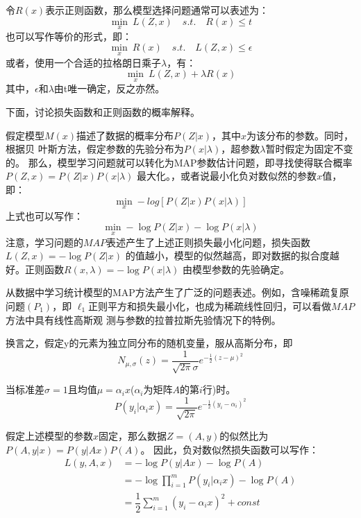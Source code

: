 令$ R(x) $表示正则函数，那么模型选择问题通常可以表述为：
\begin{equation}\label{key}
\min_{x}\:  L(Z,x)\quad s.t.\quad R(x)\leq t
\end{equation}
也可以写作等价的形式，即：
\begin{equation}\label{key}
\min_{x}\: R(x) \quad  s.t.\quad L(Z,x)\leq \epsilon
\end{equation}
或者，使用一个合适的拉格朗日乘子$\lambda $，有：
\begin{equation}\label{key}
\min_{x}\:  L(Z,x)+\lambda R(x)
\end{equation}
其中，$ \epsilon $和$ \lambda $由t唯一确定，反之亦然。

{\heiti 下面，讨论损失函数和正则函数的概率解释。}

假定模型$ M(x) $描述了数据的概率分布$ P(Z|x) $，其中$ x $为该分布的参数。同时，根据贝
叶斯方法，假定参数的先验分布为$ P(x|\lambda) $，超参数$ \lambda $暂时假定为固定不变的。
那么，模型学习问题就可以转化为MAP参数估计问题，即寻找使得联合概率$ P(Z,x)=P(Z|x)P(x|\lambda) $
最大化。，或者说最小化负对数似然的参数$ x $值，即：
\begin{equation}\label{key}
\min_{x} -log\left [P(Z|x)P(x|\lambda)\right ]
\end{equation}
上式也可以写作：
\begin{equation}\label{key}
\min_{x} -\log P(Z|x) - \log P(x|\lambda)
\end{equation}
注意，学习问题的$ MAP $表述产生了上述正则损失最小化问题，损失函数$ L(Z,x)=-\log P(Z|x) $
的值越小，模型的似然越高，即对数据的拟合度越好。正则函数$ R(x,\lambda)=-\log P(x|\lambda) $
由模型参数的先验确定。

从数据中学习统计模型的MAP方法产生了广泛的问题表述。例如，含噪稀疏复原问题$ (P_1) $，即
$ \ell_1$正则平方和损失最小化，也成为稀疏线性回归，可以看做$ MAP $方法中具有线性高斯观
测与参数的拉普拉斯先验情况下的特例。


换言之，假定y的元素为独立同分布的随机变量，服从高斯分布，即
\begin{equation}\label{key}
N_{\mu,\sigma}(z)=\dfrac{1}{\sqrt{2\pi }\sigma}e^{-\frac{1}{2}(z-\mu)^2}
\end{equation}

当标准差$\sigma =1 $且均值$ \mu =\alpha_i x$($\alpha_i$为矩阵$ A $的第$ i $行)时。
\[  P(y_i|\alpha_i x)= \dfrac{1}{\sqrt{2\pi}}e^{-\frac{1}{2}(y_i-\alpha_i)^2}   \]

假定上述模型的参数$ x $固定，那么数据$ Z=(A,y) $的似然比为$ P(A,y|x)=P(y|Ax)P(A) $。
因此，负对数似然损失函数可以写作：
\begin{equation}\label{key}
\begin{split}
L(y,A,x) &= -\log P(y|Ax) - \log P(A) \\
         &= -\log \prod_{i=1}^{m}P(y_i|\alpha_i x) -\log P(A)\\
         &= \dfrac{1}{2}\sum_{i=1}^{m}(y_i-\alpha_i x)^2 +const
\end{split}
\end{equation}

